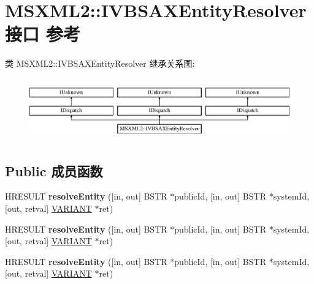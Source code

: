 \hypertarget{interface_m_s_x_m_l2_1_1_i_v_b_s_a_x_entity_resolver}{}\section{M\+S\+X\+M\+L2\+:\+:I\+V\+B\+S\+A\+X\+Entity\+Resolver接口 参考}
\label{interface_m_s_x_m_l2_1_1_i_v_b_s_a_x_entity_resolver}
类 M\+S\+X\+M\+L2\+:\+:I\+V\+B\+S\+A\+X\+Entity\+Resolver 继承关系图\+:\begin{figure}[H]
\begin{center}
\leavevmode
\includegraphics[height=2.718446cm]{interface_m_s_x_m_l2_1_1_i_v_b_s_a_x_entity_resolver}
\end{center}
\end{figure}
\subsection*{Public 成员函数}
\begin{DoxyCompactItemize}
\item 
\mbox{\label{interface_m_s_x_m_l2_1_1_i_v_b_s_a_x_entity_resolver_aa0fe7fdb80dfe384e6b733c6168ec379}} 
H\+R\+E\+S\+U\+LT {\bfseries resolve\+Entity} (\mbox{[}in, out\mbox{]} B\+S\+TR $\ast$public\+Id, \mbox{[}in, out\mbox{]} B\+S\+TR $\ast$system\+Id, \mbox{[}out, retval\mbox{]} \hyperlink{structtag_v_a_r_i_a_n_t}{V\+A\+R\+I\+A\+NT} $\ast$ret)
\item 
\mbox{\label{interface_m_s_x_m_l2_1_1_i_v_b_s_a_x_entity_resolver_aa0fe7fdb80dfe384e6b733c6168ec379}} 
H\+R\+E\+S\+U\+LT {\bfseries resolve\+Entity} (\mbox{[}in, out\mbox{]} B\+S\+TR $\ast$public\+Id, \mbox{[}in, out\mbox{]} B\+S\+TR $\ast$system\+Id, \mbox{[}out, retval\mbox{]} \hyperlink{structtag_v_a_r_i_a_n_t}{V\+A\+R\+I\+A\+NT} $\ast$ret)
\item 
\mbox{\label{interface_m_s_x_m_l2_1_1_i_v_b_s_a_x_entity_resolver_aa0fe7fdb80dfe384e6b733c6168ec379}} 
H\+R\+E\+S\+U\+LT {\bfseries resolve\+Entity} (\mbox{[}in, out\mbox{]} B\+S\+TR $\ast$public\+Id, \mbox{[}in, out\mbox{]} B\+S\+TR $\ast$system\+Id, \mbox{[}out, retval\mbox{]} \hyperlink{structtag_v_a_r_i_a_n_t}{V\+A\+R\+I\+A\+NT} $\ast$ret)
\end{DoxyCompactItemize}
